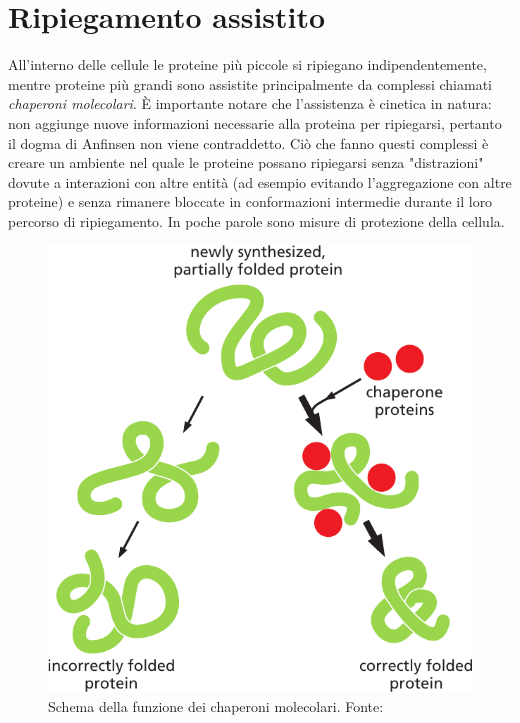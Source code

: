 \section{Ripiegamento assistito} \label{sec:assisted-folding}
{
All'interno delle cellule le proteine più piccole si ripiegano indipendentemente, mentre proteine più grandi sono assistite principalmente da complessi chiamati \textit{chaperoni molecolari}. È  importante notare che l'assistenza è cinetica in natura: non aggiunge nuove informazioni necessarie alla proteina per ripiegarsi, pertanto il dogma di Anfinsen non viene contraddetto. Ciò che fanno questi complessi è creare un ambiente nel quale le proteine possano ripiegarsi senza "distrazioni" dovute a interazioni con altre entità (ad esempio evitando l'aggregazione con altre proteine) e senza rimanere bloccate in conformazioni intermedie durante il loro percorso di ripiegamento. In poche parole sono misure di protezione della cellula. 

\begin{figure}[h]
	\centering
	\includegraphics[scale=0.4]{images/chaperone-alberts.png}
	\caption{Schema della funzione dei chaperoni molecolari. Fonte: \cite{alberts2018essential}}
	\label{fig:chaperoni}
\end{figure}

}
